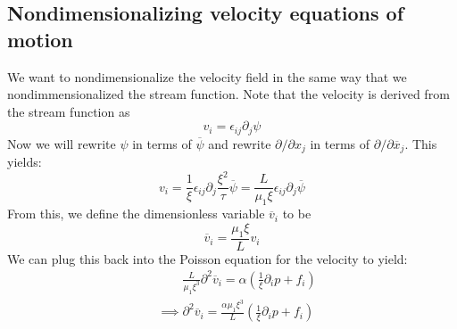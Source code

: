 \documentclass[reqno]{article}
\begin{document}
	\subsection{Nondimensionalizing velocity equations of motion}
	We want to nondimensionalize the velocity field in the same way that we nondimmensionalized the stream function.
	Note that the velocity is derived from the stream function as
	\begin{equation}
		v_i = \epsilon_{ij} \partial_j \psi
	\end{equation}
	Now we will rewrite $\psi$ in terms of $\overline{\psi}$ and rewrite $\partial/\partial x_j$ in terms of $\partial/\partial \overline{x}_j$. 
	This yields:
	\begin{equation}
		v_i 
		= \frac{1}{\xi} \epsilon_{ij} \partial_j \frac{\xi^2}{\tau} \overline{\psi}
		= \frac{L}{\mu_1 \xi} \epsilon_{ij} \partial_j \overline{\psi}
	\end{equation}
	From this, we define the dimensionless variable $\overline{v}_i$ to be
	\begin{equation}
		\overline{v}_i = \frac{\mu_1 \xi}{L} v_i
	\end{equation}
	We can plug this back into the Poisson equation for the velocity to yield:
	\begin{equation}
	\begin{split}
		&\qquad\frac{L}{\mu_1 \xi^3} \partial^2 \overline{v}_i
		= \alpha \left(
		\frac{1}{\xi} \partial_i p + f_i
		\right) \\
		&\implies
		\partial^2 \overline{v}_i
		= \frac{\alpha \mu_1 \xi^3}{L} \left(
		\frac{1}{\xi} \partial_i p
		+ f_i
		\right)
	\end{split}
	\end{equation}
	
\end{document}
